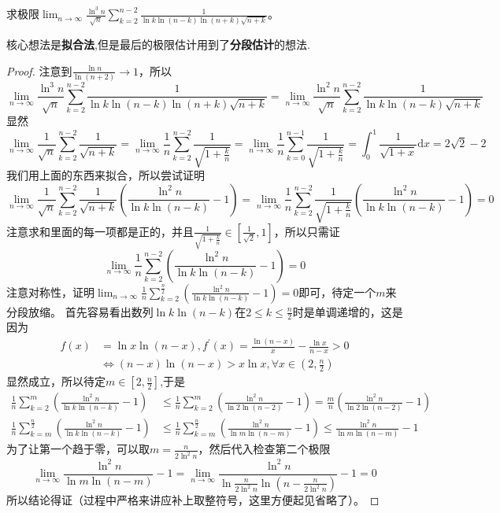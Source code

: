 \documentclass[../../main.tex]{subfiles}%
\begin{document}
\begin{example}
求极限\(\lim_{n\rightarrow\infty}\frac{\ln^3n}{\sqrt{n}}\sum_{k = 2}^{n - 2}\frac{1}{\ln k\ln(n - k)\ln(n + k)\sqrt{n + k}}\)。
\end{example}
\begin{note}
核心想法是\textbf{拟合法},但是最后的极限估计用到了\textbf{分段估计}的想法.
\end{note}
\begin{proof}
注意到\(\frac{\ln n}{\ln(n+2)}\to1\)，所以
\[
\lim_{n\rightarrow\infty}\frac{\ln^3n}{\sqrt{n}}\sum_{k = 2}^{n - 2}\frac{1}{\ln k\ln(n - k)\ln(n + k)\sqrt{n + k}}=\lim_{n\rightarrow\infty}\frac{\ln^2n}{\sqrt{n}}\sum_{k = 2}^{n - 2}\frac{1}{\ln k\ln(n - k)\sqrt{n + k}}
\]
显然
\[
\lim_{n\rightarrow\infty}\frac{1}{\sqrt{n}}\sum_{k = 2}^{n - 2}\frac{1}{\sqrt{n + k}}=\lim_{n\rightarrow\infty}\frac{1}{n}\sum_{k = 2}^{n - 2}\frac{1}{\sqrt{1+\frac{k}{n}}}=\lim_{n\rightarrow\infty}\frac{1}{n}\sum_{k = 0}^{n - 1}\frac{1}{\sqrt{1+\frac{k}{n}}}=\int_{0}^{1}\frac{1}{\sqrt{1 + x}}\mathrm{d}x=2\sqrt{2}-2
\]
我们用上面的东西来拟合，所以尝试证明
\[
\lim_{n\rightarrow\infty}\frac{1}{\sqrt{n}}\sum_{k = 2}^{n - 2}\frac{1}{\sqrt{n + k}}\left(\frac{\ln^2n}{\ln k\ln(n - k)}-1\right)=\lim_{n\rightarrow\infty}\frac{1}{n}\sum_{k = 2}^{n - 2}\frac{1}{\sqrt{1+\frac{k}{n}}}\left(\frac{\ln^2n}{\ln k\ln(n - k)}-1\right)=0
\]
注意求和里面的每一项都是正的，并且\(\frac{1}{\sqrt{1+\frac{k}{n}}}\in\left[\frac{1}{\sqrt{2}},1\right]\)，所以只需证
\[
\lim_{n\rightarrow\infty}\frac{1}{n}\sum_{k = 2}^{n - 2}\left(\frac{\ln^2n}{\ln k\ln(n - k)}-1\right)=0
\]
注意对称性，证明\(\lim_{n\rightarrow\infty}\frac{1}{n}\sum_{k = 2}^{\frac{n}{2}}\left(\frac{\ln^2n}{\ln k\ln(n - k)}-1\right)=0\)即可，待定一个\(m\)来分段放缩。
首先容易看出数列\(\ln k\ln(n - k)\)在\(2\leqslant  k\leqslant \frac{n}{2}\)时是单调递增的，这是因为
\begin{align*}
f(x)&=\ln x\ln(n - x),f^\prime(x)=\frac{\ln(n - x)}{x}-\frac{\ln x}{n - x}>0\\
&\Leftrightarrow(n - x)\ln(n - x)>x\ln x,\forall x\in\left(2,\frac{n}{2}\right)
\end{align*}
显然成立，所以待定$m\in[2,\frac{n}{2}]$,于是
\begin{align*}
\frac{1}{n}\sum_{k = 2}^{m}\left(\frac{\ln^2n}{\ln k\ln(n - k)}-1\right)&\leqslant \frac{1}{n}\sum_{k = 2}^{m}\left(\frac{\ln^2n}{\ln 2\ln(n - 2)}-1\right)=\frac{m}{n}\left(\frac{\ln^2n}{\ln 2\ln(n - 2)}-1\right)\\
\frac{1}{n}\sum_{k = m}^{\frac{n}{2}}\left(\frac{\ln^2n}{\ln k\ln(n - k)}-1\right)&\leqslant \frac{1}{n}\sum_{k = m}^{\frac{n}{2}}\left(\frac{\ln^2n}{\ln m\ln(n - m)}-1\right)\leqslant \frac{\ln^2n}{\ln m\ln(n - m)}-1
\end{align*}
为了让第一个趋于零，可以取\(m = \frac{n}{2\ln^2n}\)，然后代入检查第二个极限
\[
\lim_{n\rightarrow\infty}\frac{\ln^2n}{\ln m\ln(n - m)}-1=\lim_{n\rightarrow\infty}\frac{\ln^2n}{\ln\frac{n}{2\ln^2n}\ln\left(n-\frac{n}{2\ln^2n}\right)}-1 = 0
\]
所以结论得证（过程中严格来讲应补上取整符号，这里方便起见省略了）。
\end{proof}
\end{document}
